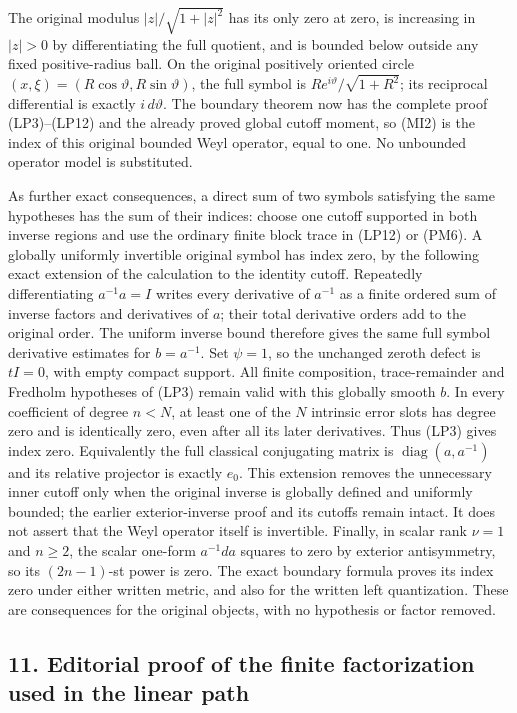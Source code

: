 \documentclass[
  11pt,
]{article}
\begin{document}
The original modulus \(|z|/\sqrt{1+|z|^2}\) has its only zero at zero,
is increasing in \(|z|>0\) by differentiating the full quotient, and is
bounded below outside any fixed positive-radius ball. On the original
positively oriented circle \((x,\xi)=(R\cos\vartheta,R\sin\vartheta)\),
the full symbol is \(R e^{i\vartheta}/\sqrt{1+R^2}\); its reciprocal
differential is exactly \(i\,d\vartheta\). The boundary theorem now has
the complete proof (LP3)--(LP12) and the already proved global cutoff
moment, so (MI2) is the index of this original bounded Weyl operator,
equal to one. No unbounded operator model is substituted.

As further exact consequences, a direct sum of two symbols satisfying
the same hypotheses has the sum of their indices: choose one cutoff
supported in both inverse regions and use the ordinary finite block
trace in (LP12) or (PM6). A globally uniformly invertible original
symbol has index zero, by the following exact extension of the
calculation to the identity cutoff. Repeatedly differentiating
\(a^{-1}a=I\) writes every derivative of \(a^{-1}\) as a finite ordered
sum of inverse factors and derivatives of \(a\); their total derivative
orders add to the original order. The uniform inverse bound therefore
gives the same full symbol derivative estimates for \(b=a^{-1}\). Set
\(\psi=1\), so the unchanged zeroth defect is \(tI=0\), with empty
compact support. All finite composition, trace-remainder and Fredholm
hypotheses of (LP3) remain valid with this globally smooth \(b\). In
every coefficient of degree \(n<N\), at least one of the \(N\) intrinsic
error slots has degree zero and is identically zero, even after all its
later derivatives. Thus (LP3) gives index zero. Equivalently the full
classical conjugating matrix is \(\operatorname{diag}(a,a^{-1})\) and
its relative projector is exactly \(e_0\). This extension removes the
unnecessary inner cutoff only when the original inverse is globally
defined and uniformly bounded; the earlier exterior-inverse proof and
its cutoffs remain intact. It does not assert that the Weyl operator
itself is invertible. Finally, in scalar rank \(\nu=1\) and \(n\ge2\),
the scalar one-form \(a^{-1}da\) squares to zero by exterior
antisymmetry, so its \((2n-1)\)-st power is zero. The exact boundary
formula proves its index zero under either written metric, and also for
the written left quantization. These are consequences for the original
objects, with no hypothesis or factor removed.

\subsection{11. Editorial proof of the finite factorization used in the
linear
path}\label{editorial-proof-of-the-finite-factorization-used-in-the-linear-path}
\end{document}
